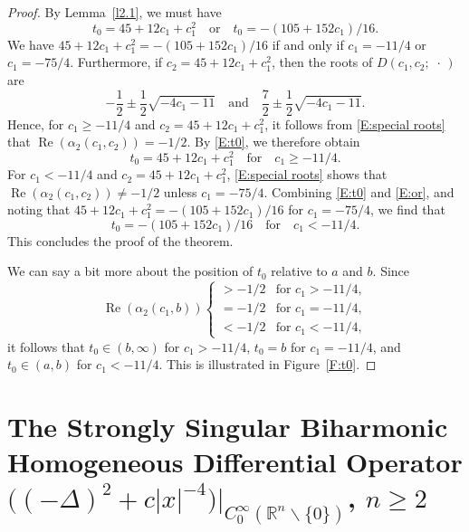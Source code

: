 \documentclass[reqno,11pt,centertags]{amsart}
\newcommand{\bbR}{{\mathbb{R}}}
\newcommand{\<}{\langle}
\renewcommand{\>}{\rangle}
\newcommand{\lb}{\label}
\newcommand{\dott}{\,\cdot\,}
\renewcommand{\Re}{\operatorname{Re}}
\numberwithin{equation}{section}
\theoremstyle{definition}
\begin{document}
\begin{proof}
By Lemma~\ref{l2.1}, we must have 
\begin{equation}\label{E:or}
t_0 = 45 + 12c_1 + c_1^2 \quad \text{or} \quad t_0 = -(105 + 152c_1)/16.
\end{equation}
We have 
$45 + 12c_1 + c_1^2 = -(105 + 152c_1)/16$
if and only if $c_1 = -11/4$ or $c_1 = -75/4$.
Furthermore, if $c_2 = 45 + 12c_1 + c_1^2$, then the roots of $D(c_1, c_2;\,\dott)$ are
\begin{equation}\label{E:special roots}
-\frac{1}{2} \pm \frac{1}{2}\sqrt{-4c_1 - 11}
\quad \text{and} \quad
\frac{7}{2} \pm \frac{1}{2}\sqrt{-4c_1 - 11}.
\end{equation}
Hence, for $c_1 \geq  -11/4$ and $c_2 = 45 + 12c_1 + c_1^2$, it follows from \eqref{E:special roots} that 
$\Re(\alpha_2(c_1, c_2)) = -1/2$. 
By \eqref{E:t0}, we therefore obtain
\begin{equation}
t_0 = 45 + 12c_1 + c_1^2 
\quad \text{for} \quad c_1 \geq -11/4.
\end{equation}
For $c_1 < -11/4$ and $c_2 = 45 + 12c_1 + c_1^2$, 
\eqref{E:special roots} shows that 
$\Re(\alpha_2(c_1, c_2)) \ne -1/2$ 
unless $c_1 = -75/4$.
Combining \eqref{E:t0} and \eqref{E:or}, and noting that 
$45 + 12c_1 + c_1^2 = -(105 + 152c_1)/16$ 
for $c_1 = -75/4$, we find that
\begin{equation}
t_0 = -(105 + 152c_1)/16
\quad \text{for} \quad c_1 <  -11/4.
\end{equation}
This concludes the proof of the theorem.

We can say a bit more about the position of $t_0$ relative to  $a$ and $b$. Since 
\begin{equation}
\Re(\alpha_2(c_1,b ))
\begin{cases}
>-1/2  & \mbox{for $c_1> -11/4$},\\
=-1/2 & \mbox{for $c_1= -11/4$},\\
<-1/2 & \mbox{for $c_1<-11/4$},
\end{cases}
\end{equation}
it follows  that $t_0 \in (b,\infty)$ for  $c_1> -11/4$, $t_0=b$  for $c_1= -11/4$, and $t_0\in (a,b)$ for $c_1<-11/4$.
This is illustrated in Figure~\ref{F:t0}. 
\end{proof}


\section{The Strongly Singular Biharmonic Homogeneous Differential Operator 
$\big((- \Delta)^2 +c|x|^{-4}\big)\big|_{C_0^{\infty}(\bbR^n \backslash \{0\})}$, $n \geq 2$} \lb{s3}
\end{document}
